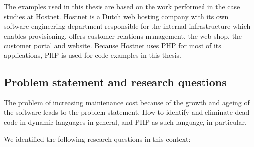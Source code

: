 The examples used in this thesis are based on the work performed in the case studies at Hostnet.  Hostnet is a Dutch web hosting company with its own software engineering department responsible for the internal infrastructure which enables provisioning, offers customer relations management, the web shop, the customer portal and website. Because Hostnet uses PHP for most of its applications, PHP is used for code examples in this thesis.



\subsection*{Problem statement and research questions\label{sec:problem}}
The problem of increasing maintenance cost because of the growth and ageing of the software leads to the problem statement.
How to identify and eliminate dead code in dynamic languages in general, and PHP as such language, in particular.

We identified the following research questions in this context:

